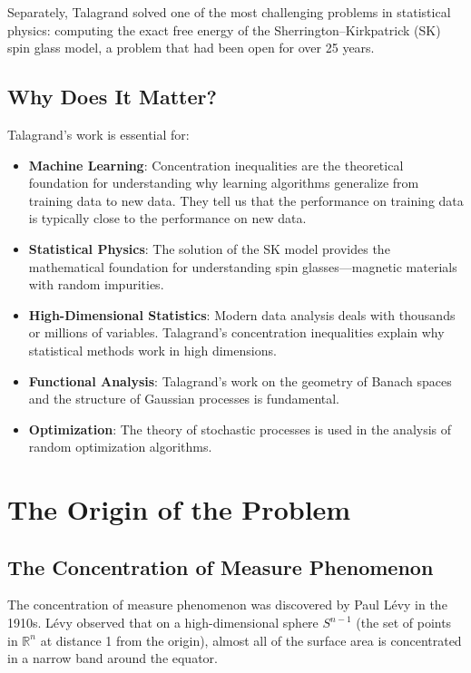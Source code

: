Separately, Talagrand solved one of the most challenging problems in statistical physics: computing the exact free energy of the Sherrington--Kirkpatrick (SK) spin glass model, a problem that had been open for over 25 years.

\subsection{Why Does It Matter?}

Talagrand's work is essential for:
\begin{itemize}
\item \textbf{Machine Learning}: Concentration inequalities are the theoretical foundation for understanding why learning algorithms generalize from training data to new data. They tell us that the performance on training data is typically close to the performance on new data.

\item \textbf{Statistical Physics}: The solution of the SK model provides the mathematical foundation for understanding spin glasses---magnetic materials with random impurities.

\item \textbf{High-Dimensional Statistics}: Modern data analysis deals with thousands or millions of variables. Talagrand's concentration inequalities explain why statistical methods work in high dimensions.

\item \textbf{Functional Analysis}: Talagrand's work on the geometry of Banach spaces and the structure of Gaussian processes is fundamental.

\item \textbf{Optimization}: The theory of stochastic processes is used in the analysis of random optimization algorithms.
\end{itemize}

\section{The Origin of the Problem}

\subsection{The Concentration of Measure Phenomenon}

The concentration of measure phenomenon was discovered by Paul L\'evy in the 1910s. L\'evy observed that on a high-dimensional sphere $S^{n-1}$ (the set of points in $\mathbb{R}^n$ at distance 1 from the origin), almost all of the surface area is concentrated in a narrow band around the equator.

